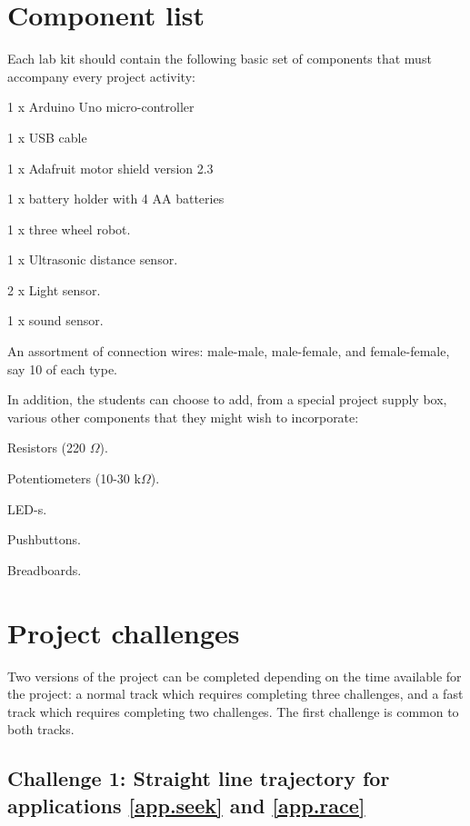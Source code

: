 \documentclass[12pt]{book}
\begin{document}
\section{Component list}

Each lab kit should contain the following basic set of components
that must accompany every project activity:

\begin{compactitem}[--]
  \item 1 x Arduino Uno micro-controller
  \item 1 x USB cable
  \item 1 x Adafruit motor shield version 2.3
  \item 1 x battery holder with 4 AA batteries
  \item 1 x three wheel robot.
  \item 1 x Ultrasonic distance sensor.
  \item 2 x Light sensor.
  \item 1 x sound sensor.
  \item An assortment of connection wires: male-male, male-female, and
    female-female, say 10 of each type.
\end{compactitem}

In addition, the students can choose to add, from a special project supply
box, various other components that they might wish to incorporate:
\begin{compactitem}[--]
\item Resistors (220 $\Omega$).
\item Potentiometers (10-30 k$\Omega$).
\item LED-s.
\item Pushbuttons.
\item Breadboards.
\end{compactitem}


\section {Project challenges}

Two versions of the project can be completed depending on the time available for the project: a normal track which requires completing three challenges, and a fast track which requires completing two challenges. The first challenge is common to both tracks.

\subsection{Challenge 1: Straight line trajectory for applications \ref{app.seek} and \ref{app.race} }\label{proj1:chap}
\end{document}
